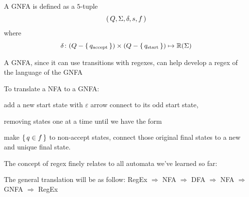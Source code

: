\begin{definition}[GNFA]
    A GNFA is defined as a $5$-tuple
    \[
        { \left(\, Q,\Sigma,\delta,s,f \,\right) }
    \]
    where
    \[
        \delta \colon
        (Q - { \left\{\,q_{\text{accept}}\,\right\} }) \times (Q - { \left\{\,q_{\text{start}}\,\right\} })
        \mapsto
        \mathbb R(\Sigma)
    \]
\end{definition}

A GNFA, since it can use transitions with regexes, can help develop a regex of the
language of the GNFA 

To translate a NFA to a GNFA:
\begin{compactenum}
\item add a new start state with $\varepsilon$ arrow connect to its odd start state, 
\item removing states one at a time until we have the form
\item make ${ \left\{\,q \in f\,\right\} }$ to non-accept states, connect those original final states to a
    new and unique final state.
\end{compactenum}

\bigskip

The concept of regex finely relates to all automata we've learned so far:

The general translation will be as follow:
RegEx $ \Rightarrow $ NFA $ \Rightarrow $ DFA $ \Rightarrow $ NFA $ \Rightarrow $ GNFA $
\Rightarrow $ RegEx

